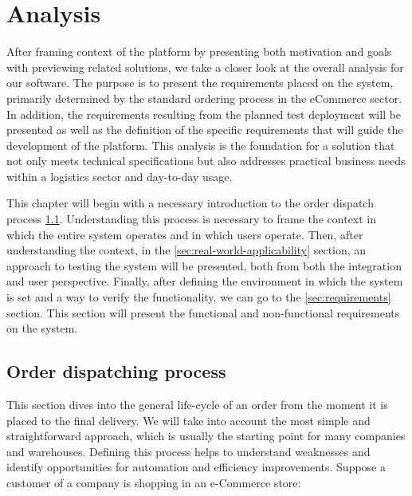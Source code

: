 \chapter{Analysis}
\label{chap:analysis}
After framing context of the platform by presenting both motivation and goals with previewing related solutions, we take a closer look at the overall analysis for our software.
The purpose is to present the requirements placed on the system, primarily determined by the standard ordering process in the eCommerce sector.
In addition, the requirements resulting from the planned test deployment will be presented as well as the definition of the specific requirements that will guide the development of the platform. %
This analysis is the foundation for a solution that not only meets technical specifications but also addresses practical business needs within a logistics sector and day-to-day usage.

This chapter will begin with a necessary introduction to the order dispatch process \ref{sec:order-dispatching-process}. 
Understanding this process is necessary to frame the context in which the entire system operates and in which users operate.
Then, after understanding the context, in the \ref{sec:real-world-applicability} section, an approach to testing the system will be presented, both from both the integration and user perspective.
Finally, after defining the environment in which the system is set and a way to verify the functionality, we can go to the \ref{sec:requirements} section.
This section will present the functional and non-functional requirements on the system.

% 



\section{Order dispatching process}
\label{sec:order-dispatching-process}
This section dives into the general life-cycle of an order from the moment it is placed to the final delivery.
We will take into account the most simple and straightforward approach, which is usually the starting point for many companies and warehouses.
Defining this process helps to understand weaknesses and identify opportunities for automation and efficiency improvements.
Suppose a customer of a company is shopping in an e-Commerce store:

